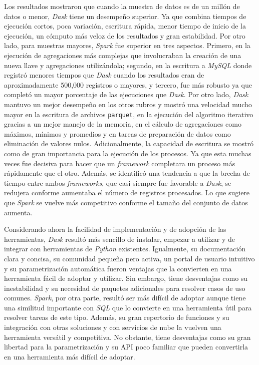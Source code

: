 \documentclass[11pt, oneside]{book}
\begin{document}
Los resultados mostraron que cuando la muestra de datos es de un millón de datos o menor, \textit{Dask} tiene un desempeño superior. Ya que combina tiempos de ejecución cortos, poca variación, 
escritura rápida, menor tiempo de inicio de la ejecución, un cómputo más veloz de los resultados y gran estabilidad. Por otro lado, para muestras mayores, \textit{Spark} fue superior en tres aspectos. Primero, en la ejecución de agregaciones más complejas que involucraban la creación de una nueva llave y agregaciones utilizándola; segundo, en la escritura a \textit{MySQL} donde registró menores tiempos que \textit{Dask} cuando los resultados eran de aproximadamente 500,000 registros o mayores, y tercero, fue más robusto ya que completó un mayor porcentaje de las ejecuciones que \textit{Dask}. Por otro lado, \textit{Dask} mantuvo un mejor desempeño en los otros rubros y mostró una velocidad mucho mayor en la escritura de archivos \texttt{parquet}, en la ejecución del algoritmo iterativo gracias a un mejor manejo de la memoria, en el cálculo de agregaciones como máximos, mínimos y promedios y en tareas de preparación de datos como eliminación de valores nulos. Adicionalmente, la capacidad de escritura se mostró como de gran importancia para la ejecución de los procesos. Ya que esta muchas veces fue decisiva para hacer que un \textit{framework} completara un proceso más rápidamente que el otro. Además, se identificó una tendencia a que la brecha de tiempo entre ambos \textit{frameworks}, que casi siempre fue favorable a \textit{Dask}, se redujera conforme aumentaba el número de registros procesados. Lo que sugiere que \textit{Spark} se vuelve más competitivo conforme el tamaño del conjunto de datos aumenta.

Considerando ahora la facilidad de implementación y de adopción de las herramientas, \textit{Dask} resultó más sencillo de instalar, empezar a utilizar y de integrar con herramientas de \textit{Python} existentes. Igualmente, su documentación clara y concisa, su comunidad pequeña pero activa, un portal de usuario intuitivo y su parametrización automática fueron ventajas que la convierten en una herramienta fácil de adoptar y utilizar. Sin embargo, tiene desventajas como su inestabilidad y su necesidad de paquetes adicionales para resolver casos de uso comunes. \textit{Spark}, por otra parte, resultó ser más difícil de adoptar aunque tiene una similitud importante con \textit{SQL} que lo convierte en una herramienta útil para resolver tareas de este tipo. Además, su gran repertorio de funciones y su integración con otras soluciones y con servicios de nube la vuelven una herramienta versátil y competitiva. No obstante, tiene desventajas como su gran libertad para la parametrización y su API poco familiar que pueden convertirla en una herramienta más difícil de adoptar.
\end{document}
